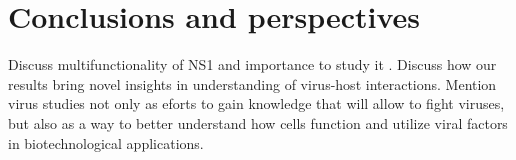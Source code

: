 \newpage
\section{Conclusions and perspectives}

	Discuss multifunctionality of NS1 and importance to study it \cite{Anastasina2014}. Discuss how our results bring novel insights in understanding of virus-host interactions. Mention virus studies not only as eforts to gain knowledge that will allow to fight viruses, but also as a way to better understand how cells function and utilize viral factors in biotechnological applications.